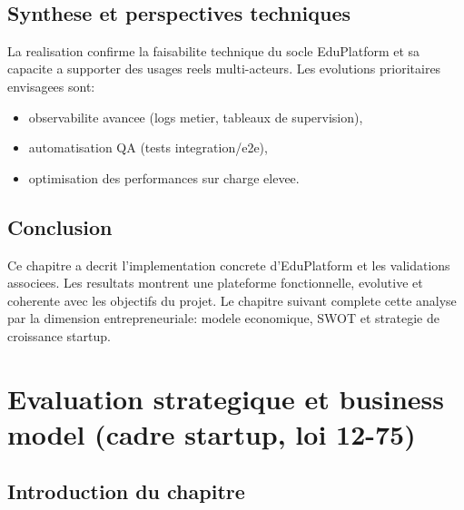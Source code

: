 ﻿﻿\documentclass[12pt,a4paper,oneside]{report}
\begin{document}
\section{Synthese et perspectives techniques}

La realisation confirme la faisabilite technique du socle EduPlatform et sa capacite a supporter des usages reels multi-acteurs. Les evolutions prioritaires envisagees sont:
\begin{itemize}
  \item observabilite avancee (logs metier, tableaux de supervision),
  \item automatisation QA (tests integration/e2e),
  \item optimisation des performances sur charge elevee.
\end{itemize}

\section{Conclusion}

Ce chapitre a decrit l'implementation concrete d'EduPlatform et les validations associees. Les resultats montrent une plateforme fonctionnelle, evolutive et coherente avec les objectifs du projet. Le chapitre suivant complete cette analyse par la dimension entrepreneuriale: modele economique, SWOT et strategie de croissance startup.


\chapter{Evaluation strategique et business model (cadre startup, loi 12-75)}

\section{Introduction du chapitre}
\end{document}
